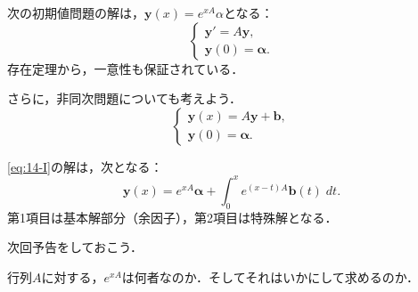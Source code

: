 \begin{theorem}
    次の初期値問題の解は，$\bm{y}(x)=e^{xA}\alpha$となる：
    \[ \begin{cases}
        \bm{y}' = A\bm{y}, \\
        \bm{y}(0) = \bm{\alpha}.
    \end{cases}\]
    存在定理から，一意性も保証されている．
\end{theorem}
さらに，非同次問題についても考えよう．
\begin{equation} \label{eq:14-I}
    \begin{cases}
        \bm{y}(x) = A\bm{y} + \bm{b}, \\
        \bm{y}(0) = \bm{\alpha}.
    \end{cases}
\end{equation}

\begin{theorem}
    \eqref{eq:14-I}の解は，次となる：
    \[ \bm{y}(x) = e^{xA}\bm{\alpha} + \int_{0}^{x} e^{(x-t)A}\bm{b}(t) \; dt.\]
    第1項目は基本解部分（余因子），第2項目は特殊解となる．
\end{theorem}

\vfill
次回予告をしておこう．
\begin{question*}
    行列$A$に対する，$e^{xA}$は何者なのか．そしてそれはいかにして求めるのか．
\end{question*}